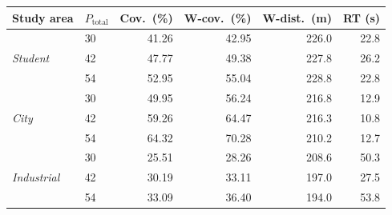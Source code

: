\begin{tabular}{llrrrr}
\toprule
\textbf{Study area} & $P_{\text{total}}$
  & \textbf{Cov.\ (\%)}
  & \textbf{W-cov.\ (\%)}
  & \textbf{W-dist.\ (m)}
  & \textbf{RT (s)} \\
\midrule
\multirow{3}{*}{\textit{Student}}
  & 30 & 41.26 & 42.95 & 226.0 & 22.8 \\
  & 42 & 47.77 & 49.38 & 227.8 & 26.2 \\
  & 54 & 52.95 & 55.04 & 228.8 & 22.8 \\
\midrule
\multirow{3}{*}{\textit{City}}
  & 30 & 49.95 & 56.24 & 216.8 & 12.9 \\
  & 42 & 59.26 & 64.47 & 216.3 & 10.8 \\
  & 54 & 64.32 & 70.28 & 210.2 & 12.7 \\
\midrule
\multirow{3}{*}{\textit{Industrial}}
  & 30 & 25.51 & 28.26 & 208.6 & 50.3 \\
  & 42 & 30.19 & 33.11 & 197.0 & 27.5 \\
  & 54 & 33.09 & 36.40 & 194.0 & 53.8 \\
\bottomrule
\end{tabular}

